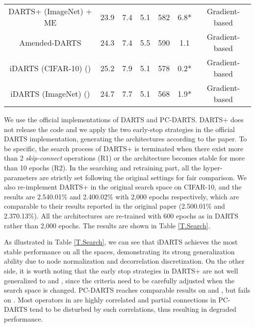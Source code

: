 \documentclass[journal]{IEEEtran}
\begin{document}
\begin{table*}[!htpb]
\begin{center}
{\begin{tabular}{c|c|c|c|c|c|c}
DARTS+ (ImageNet) + ME \cite{DBLP:journals/corr/abs-1909-06035} & 23.9 & 7.4 & 5.1 & 582 & 6.8* &Gradient-based \\
Amended-DARTS \cite{DBLP:journals/corr/abs-1910-11831} & 24.3 & 7.4 & 5.5 & 590 & 1.1 & Gradient-based \\
\hline 
iDARTS (CIFAR-10) () & 25.2 & 7.9 & 5.1 & 578 & 0.2* &Gradient-based\\
iDARTS (ImageNet) () & 24.7 & 7.7 & 5.1 & 568 & 1.9* &Gradient-based \\
\hline
\hline
\end{tabular}}
\label{T.ImageNet}
\end{center}
\end{table*}


 

We use the official implementations of DARTS and PC-DARTS. DARTS+ does not release the code and we apply the two early-stop strategies in the official DARTS implementation, generating the architectures according to the paper. To be specific, the search process of DARTS+ is terminated when there exist more than 2 \textit{skip-connect} operations (R1) or the architecture becomes stable for more than 10 epochs (R2). In the searching and retraining part, all the hyper-parameters are strictly set following the original settings for fair comparison. We also re-implement DARTS+ in the original search space on CIFAR-10, and the results are 2.540.01\% and 2.400.02\% with 2,000 epochs respectively, which are comparable to their results reported in the original paper (2.500.01\% and 2.370.13\%). All the architectures are re-trained with 600 epochs as in DARTS rather than 2,000 epochs. The results are shown in Table \ref{T.Search}.

As illustrated in Table \ref{T.Search}, we can see that iDARTS achieves the most stable performance on all the spaces, demonstrating its strong generalization ability due to node normalization and decorrelation discretization. On the other side, it is worth noting that the early stop strategies in DARTS+ are not well generalized to  and , since the criteria need to be carefully adjusted when the search space is changed. 
PC-DARTS reaches comparable results on  and , but fails on . Most operators in  are highly correlated and partial connections in PC-DARTS tend to be disturbed by such correlations, thus resulting in degraded performance.
\end{document}

